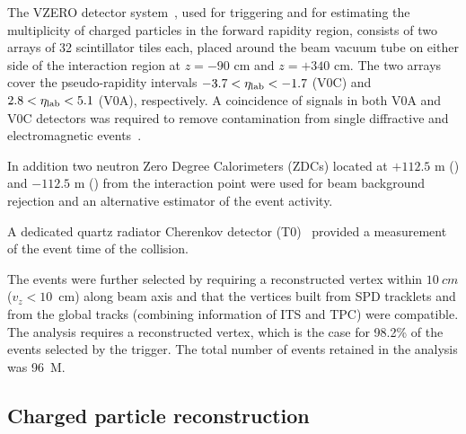 The VZERO detector system~\cite{Abbas:2013taa}, used for triggering and for estimating the multiplicity of charged particles in the forward rapidity region, consists of two arrays of 32 scintillator tiles each, placed around the beam vacuum tube on either side of the interaction region at $z =-90$ cm and $z=+340$ cm. The two arrays cover the pseudo-rapidity intervals $-3.7 < \eta_{\rm lab} < -1.7$ (V0C) and $2.8 < \eta_{\rm lab} < 5.1$ (V0A), respectively. 
A coincidence of signals in both V0A and V0C detectors was required to remove contamination from single diffractive and electromagnetic events~\cite{ALICE:2012xs}. 

In addition two neutron Zero Degree Calorimeters (ZDCs) located at $+112.5$ m (\ZNA) and $-112.5$ m (\ZNC) from the interaction point were used for beam background rejection and an alternative estimator of the event activity.

A dedicated quartz radiator Cherenkov detector (T0)~\cite{Akindinov:2013tea} provided a measurement of the event time of the collision.


The events were further selected by requiring a reconstructed vertex within $10~cm$ ($v_{z}<10$~cm) along beam axis and that the vertices built from SPD tracklets and from the global tracks (combining information of ITS and TPC) were compatible. 
The analysis requires a reconstructed vertex, which is the case for 98.2\% of the events selected by the trigger. The total number of events retained in the analysis was 96~M.

\subsection{Charged particle reconstruction}

